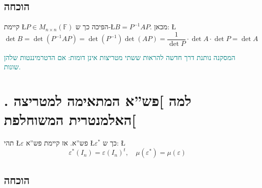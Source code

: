 \documentclass[english,hebrew]{article}
\begin{document}
\subsection{הוכחה}

קיימת \L{$P\in M_{n\times n}(\mathbb{F})$} הפיכה כך ש-\L{$B=P^{-1}AP$}.
מכאן: \L{%
\[
\det B=\det(P^{-1}AP)=\det(P^{-1})\det(AP)=\frac{1}{\det P}\cdot\det A\cdot\det P=\det A
\]
}%

\textcolor{teal}{המסקנה נותנת דרך חדשה להראות ששתי מטריצות אינן דומות:
אם הדטרמיננטות שלהן שונות.}

\section{{\endL}. למה {]}פש\textquotedblright א המתאימה למטריצה
האלמנטרית המשוחלפת{[}}

תהי \L{$\varepsilon$} פש\textquotedblright א. אז קיימת פש\textquotedblright א
\L{$\varepsilon^{*}$} כך ש: \L{%
\[
\varepsilon^{*}(I_{n})=\varepsilon(I_{n})^{t},\quad\mu(\varepsilon^{*})=\mu(\varepsilon)
\]
}%

\subsection{הוכחה}
\end{document}
